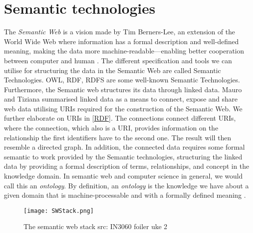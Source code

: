 \section{Semantic technologies}
The \emph{Semantic Web} is a vision made by Tim Berners-Lee, an extension of the World Wide Web where information has a formal description and well-defined meaning, making the data more machine-readable—enabling better cooperation between computer and human \autocite{Berner-Lee_The_samantic_web}. The different specification and tools we can utilise for structuring the data in the Semantic Web are called Semantic Technologies. OWL, RDF, RDFS are some well-known Semantic Technologies. Furthermore, the Semantic web structures its data through linked data. Mauro and Tiziana summarised linked data as a means to connect, expose and share web data utilising URIs required for the construction of the Semantic Web\autocite{Mauro_Tiziana_linked_data}. We further elaborate on URIs in \autoref{RDF}. The connections connect different URIs, where the connection, which also is a URI, provides information on the relationship the first identifiers have to the second one. The result will then resemble a directed graph. In addition, the connected data requires some formal semantic to work provided by the Semantic technologies, structuring the linked data by providing a formal description of terms, relationships, and concept in the knowledge domain. In semantic web and computer science in general, we would call this an \emph{ontology}. By definition, an \emph{ontology} is the knowledge we have about a given domain that is machine-processable and with a formally defined meaning \autocite{FOSWT}.

\begin{figure}
    \centering
    \texttt{[image: SWStack.png]}
    \caption{The semantic web stack src: IN3060 foiler uke 2}
    \label{fig:SW stack}
\end{figure}


